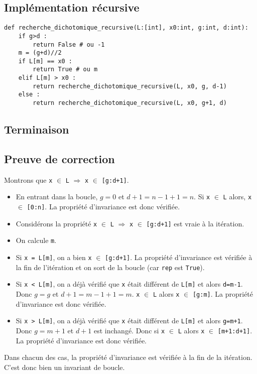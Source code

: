 \subsection{Implémentation récursive}
\begin{lstlisting}
def recherche_dichotomique_recursive(L:[int], x0:int, g:int, d:int):
    if g>d : 
        return False # ou -1
    m = (g+d)//2
    if L[m] == x0 :
        return True # ou m
    elif L[m] > x0 :
        return recherche_dichotomique_recursive(L, x0, g, d-1)
    else :
        return recherche_dichotomique_recursive(L, x0, g+1, d)
\end{lstlisting} 


\subsection{Terminaison}

\subsection{Preuve de correction}

Montrons que \lstinline{x} $\in$ \lstinline{L} $\Rightarrow$ \lstinline{x} $\in$ \lstinline{[g:d+1]}.

\begin{itemize}
\item En entrant dans la boucle, $g=0$ et $d+1=n-1+1=n$. Si \lstinline{x} $\in$ \lstinline{L} alors, \lstinline{x} $\in$ \lstinline{[0:n]}. La propriété d'invariance est donc vérifiée.

\item Considérons la propriété 
\lstinline{x} $\in$ \lstinline{L} $\Rightarrow$ \lstinline{x} $\in$ \lstinline{[g:d+1]}
est vraie à la \ieme itération.

\item On calcule \lstinline{m}.

\item Si \lstinline{x = L[m]}, on a bien \lstinline{x} $\in$ \lstinline{[g:d+1]}. La propriété d'invariance est vérifiée à la fin de l'itération et on sort de la boucle (car \lstinline{rep} est \lstinline{True}). 

\item Si \lstinline{x < L[m]}, on a déjà vérifié que \lstinline{x} était différent de \lstinline{L[m]} et alors \lstinline{d=m-1}. Donc $g=g$ et $d+1=m-1+1=m$.
\lstinline{x} $\in$ \lstinline{L} alors \lstinline{x} $\in$ \lstinline{[g:m]}. La propriété d'invariance est donc vérifiée.

\item Si \lstinline{x > L[m]}, on a déjà vérifié que \lstinline{x} était différent de \lstinline{L[m]} et alors \lstinline{g=m+1}. Donc $g=m+1$ et $d+1$ est inchangé.
 Donc si 
\lstinline{x} $\in$ \lstinline{L} alors \lstinline{x} $\in$ \lstinline{[m+1:d+1]}. La propriété d'invariance est donc vérifiée.
\end{itemize}
Dans chacun des cas, la propriété d'invariance est vérifiée à la fin de la \ieme itération. C'est donc bien un invariant de boucle. 

